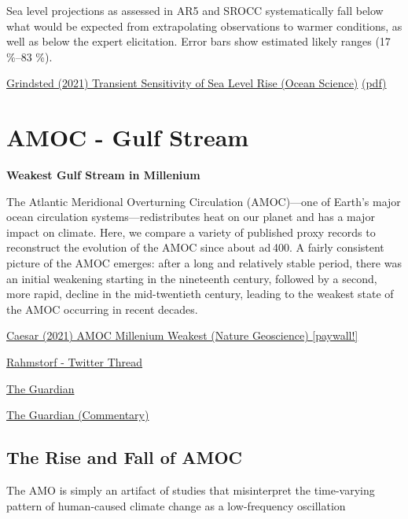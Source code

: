\documentclass[
]{book}
\begin{document}
Sea level projections as assessed in AR5 and SROCC systematically fall
below what would be expected from extrapolating observations to
warmer conditions, as well as below the expert elicitation. Error
bars show estimated likely ranges (17 \%--83 \%).

\href{https://os.copernicus.org/articles/17/181/2021/}{Grindsted (2021) Transient Sensitivity of Sea Level Rise (Ocean Science)}
\href{pdf/Grindsted_2021_Transient_Sensitivity_of_Sea_Level_Rise.pdf}{(pdf)}

\hypertarget{amoc---gulf-stream}{%
\section{AMOC - Gulf Stream}\label{amoc---gulf-stream}}

\textbf{Weakest Gulf Stream in Millenium}

The Atlantic Meridional Overturning Circulation (AMOC)---one of Earth's major ocean circulation systems---redistributes heat on our planet and has a major impact on climate. Here, we compare a variety of published proxy records to reconstruct the evolution of the AMOC since about ad 400. A fairly consistent picture of the AMOC emerges: after a long and relatively stable period, there was an initial weakening starting in the nineteenth century, followed by a second, more rapid, decline in the mid-twentieth century, leading to the weakest state of the AMOC occurring in recent decades.

\href{https://www.nature.com/articles/s41561-021-00699-z}{Caesar (2021) AMOC Millenium Weakest (Nature Geoscience) {[}paywall!{]}}

\href{https://twitter.com/rahmstorf/status/1364976597250568194}{Rahmstorf - Twitter Thread}

\href{https://www.theguardian.com/environment/2021/feb/25/atlantic-ocean-circulation-at-weakest-in-a-millennium-say-scientists}{The Guardian}

\href{https://www.theguardian.com/commentisfree/2021/feb/26/atlantic-currents-climate-oceans-next-century}{The Guardian (Commentary)}

\hypertarget{the-rise-and-fall-of-amoc}{%
\subsection{The Rise and Fall of AMOC}\label{the-rise-and-fall-of-amoc}}

The AMO is simply an artifact of studies that misinterpret
the time-varying pattern of human-caused climate change
as a low-frequency oscillation
\end{document}
